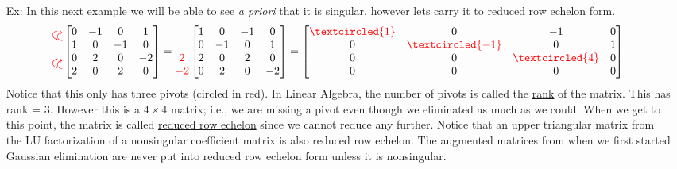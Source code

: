 \documentclass[reqno]{amsart}
\theoremstyle{definition}
\begin{document}
\begin{itemize}
\item[Ex:  ]  In this next example we will be able to see \emph{a priori} that it is singular, however lets carry it to reduced row echelon form.
%
\begin{equation*}
\begin{matrix}
\curvearrowdown\curvearrowup\\
\\
\curvearrowdown\curvearrowup\\

\end{matrix}\begin{bmatrix}
0 & -1 & 0 & 1\\
1 & 0 & -1 & 0\\
0 & 2 & 0 & -2\\
2 & 0 & 2 & 0
\end{bmatrix} = \begin{matrix}
\\
\\
{\color{red}2}\\
{\color{red}-2}
\end{matrix}\begin{bmatrix}
1 & 0 & -1 & 0\\
0 & -1 & 0 & 1\\
2 & 0 & 2 & 0\\
0 & 2 & 0 & -2
\end{bmatrix} = \begin{bmatrix}
{\color{red}\textcircled{1}} & 0 & -1 & 0\\
0 & {\color{red}\textcircled{-1}} & 0 & 1\\
0 & 0 & {\color{red}\textcircled{4}} & 0\\
0 & 0 & 0 & 0
\end{bmatrix}
\end{equation*}
%
Notice that this only has three pivots (circled in red).  In Linear Algebra, the number of pivots is called the {\color{red}\underline{rank}} of the matrix.  This has rank = 3.  However this is a $4\times 4$ matrix; i.e., we are missing a pivot even though we eliminated as much as we could.  When we get to this point, the matrix is called {\color{red}\underline{reduced row echelon}} since we cannot reduce any further.  Notice that an upper triangular matrix from the LU factorization of a nonsingular coefficient matrix is also reduced row echelon.  The augmented matrices from when we first started Gaussian elimination are never put into reduced row echelon form unless it is nonsingular.


\end{itemize}
\end{document}
